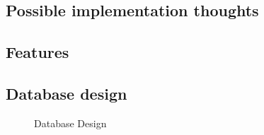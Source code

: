 \documentclass{article}
\begin{document}
\subsection{Possible implementation thoughts}

\subsection{Features} %




\subsection{Database design}


\begin{figure}[H]
\capstart
	\centering
	\caption{Database Design\label{fig:database-design}}
\end{figure}








\end{document}

